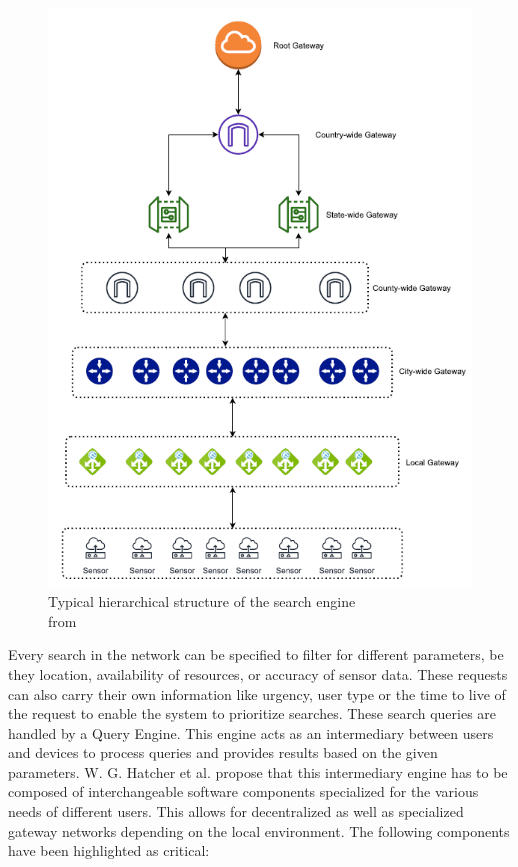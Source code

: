 \documentclass [journal]{IEEEtran}
\begin{document}
 \begin{figure} [h]
 \centering
 \includegraphics [width= \columnwidth]{IoTnaming.png}
 \caption{Typical hierarchical structure of the search engine \\
from \cite{main}}
 \end{figure}
Every search in the network can be specified to filter for different parameters, be they  location, availability of resources, or accuracy of sensor data. These requests can also carry their own information like urgency, user type or the time to live of the request to enable the system to prioritize searches. These search queries are handled by a Query Engine. This engine acts as an intermediary between users and devices to process queries and provides results based on the given parameters. W. G. Hatcher et al. propose that this intermediary engine has to be composed of interchangeable software components specialized for the various needs of different users. This allows for decentralized as well as specialized gateway networks depending on the local environment. The following components have been highlighted as critical:
\end{document}
